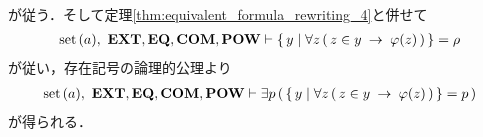 \begin{sketch}
\begin{description}
\begin{align}
				\end{align}
				が従う．そして定理\ref{thm:equivalent_formula_rewriting_4}と併せて
				\begin{align}
					\operatorname*{set}\hspace{0.15em}(a),\ \mbox{{\bf EXT}},\mbox{{\bf EQ}},\mbox{\bf COM},\mbox{{\bf POW}} \vdash 
					\{\, y \mid \forall z\, (\, z \in y \hspace{0.25em}\rightarrow\hspace{0.25em} \varphi(z)\, )\, \} = \rho
				\end{align}
				が従い，存在記号の論理的公理より
				\begin{align}
					\operatorname*{set}\hspace{0.15em}(a),\ \mbox{{\bf EXT}},\mbox{{\bf EQ}},\mbox{\bf COM},\mbox{{\bf POW}} \vdash \exists p\, 
					(\, \{\, y \mid \forall z\, (\, z \in y \hspace{0.25em}\rightarrow\hspace{0.25em} \varphi(z)\, )\, \} = p\, )
				\end{align}
				が得られる．
				\QED
		\end{description}
	\end{sketch}
